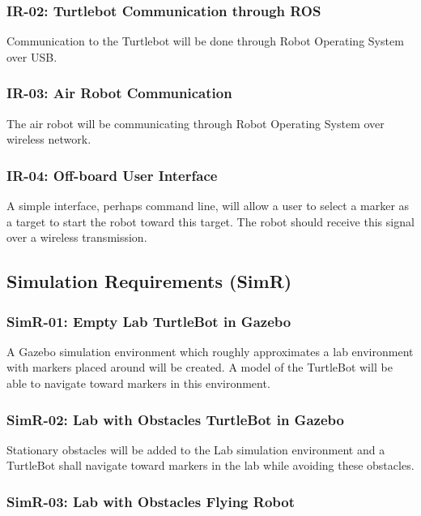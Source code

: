 \documentclass{article}
\begin{document}
		\subsubsection{IR-02: Turtlebot Communication through ROS}
		
		Communication to the Turtlebot will be done through Robot Operating System over USB.
		
		\subsubsection{IR-03: Air Robot Communication}
		
		The air robot will be communicating through Robot Operating System over wireless network.
		
		\subsubsection{IR-04: Off-board User Interface}
		
		A simple interface, perhaps command line, will allow a user to select a marker as a target to start the robot toward this target. The robot should receive this signal over a wireless transmission.
		
	\subsection{Simulation Requirements (SimR)}
	
		\subsubsection{SimR-01: Empty Lab TurtleBot in Gazebo}
		
		A Gazebo simulation environment which roughly approximates a lab environment with markers placed around will be created. A model of the TurtleBot will be able to navigate toward markers in this environment.
		
		\subsubsection{SimR-02: Lab with Obstacles TurtleBot in Gazebo}
		
		Stationary obstacles will be added to the Lab simulation environment and a TurtleBot shall navigate toward markers in the lab while avoiding these obstacles.
		
		\subsubsection{SimR-03: Lab with Obstacles Flying Robot}
		
\end{document}
